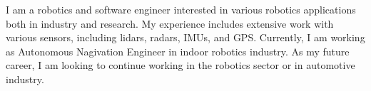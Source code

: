 

\begin{cvparagraph}

I am a robotics and software engineer interested in various robotics applications both in industry and research. My experience includes extensive work with various sensors, including lidars, radars, IMUs, and GPS. Currently, I am working as Autonomous Nagivation Engineer in indoor robotics 
industry. As my future career, I am looking to continue working in the robotics sector or in automotive industry.
\end{cvparagraph}
